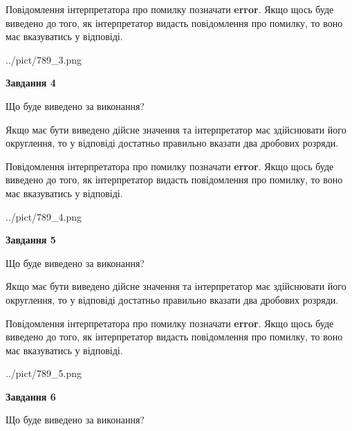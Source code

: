 \documentclass[12pt, ukrainian]{article}
\begin{document}
{\begin {Large}
Повідомлення інтерпретатора про помилку позначати \textbf{error}.
Якщо щось буде виведено до того, як інтерпретатор видасть повідомлення про помилку, 
то воно має вказуватись у відповіді. \par

\begin{center}
	{../pict/789_3.png}
\end{center}
\newpage

{\begin {center}\textbf{Завдання 4}\end {center}}\par
Що буде виведено за виконання? \par

Якщо має бути виведено дійсне значення та інтерпретатор має здійснювати його округлення, 
то у відповіді достатньо правильно вказати два дробових розряди.

Повідомлення інтерпретатора про помилку позначати \textbf{error}.
Якщо щось буде виведено до того, як інтерпретатор видасть повідомлення про помилку, 
то воно має вказуватись у відповіді. \par

\begin{center}
	{../pict/789_4.png}
\end{center}
\newpage

{\begin {center}\textbf{Завдання 5}\end {center}}\par
Що буде виведено за виконання? \par

Якщо має бути виведено дійсне значення та інтерпретатор має здійснювати його округлення, 
то у відповіді достатньо правильно вказати два дробових розряди.

Повідомлення інтерпретатора про помилку позначати \textbf{error}.
Якщо щось буде виведено до того, як інтерпретатор видасть повідомлення про помилку, 
то воно має вказуватись у відповіді. \par

\begin{center}
	{../pict/789_5.png}
\end{center}
\newpage

{\begin {center}\textbf{Завдання 6}\end {center}}\par
Що буде виведено за виконання? \par


\end{Large}}
\end{document}
